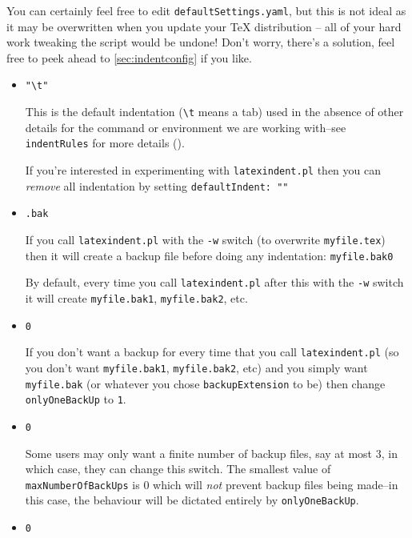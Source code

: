 \documentclass[11pt]{article}
\newcommand{\verbitem}[1]{\small\ttfamily{#1}}
\begin{document}
You can certainly feel free to edit \lstinline!defaultSettings.yaml!, but
this is not ideal as it may be overwritten when you update your \TeX{} distribution --
all of your hard work tweaking the script would be undone! Don't worry,
there's a solution, feel free to peek ahead to \cref{sec:indentconfig} if you like.
\begin{itemize}
	\item[\verbitem{defaultIndent}] \lstinline!"\t"!

		This is the default indentation (\lstinline!\t! means a tab) used in the absence of other details
		for the command or environment we are working with--see \lstinline!indentRules!
		for more details ().

		If you're interested in experimenting with \lstinline!latexindent.pl! then you
		can \emph{remove} all indentation by setting \lstinline!defaultIndent: ""!
	\item[\verbitem{backupExtension}] \lstinline!.bak!

		If you call \lstinline!latexindent.pl! with the \lstinline!-w! switch (to overwrite
		\lstinline!myfile.tex!) then it will create a backup file before doing
		any indentation: \lstinline!myfile.bak0!

		By default, every time you call \lstinline!latexindent.pl! after this with
		the \lstinline!-w! switch it will create \lstinline!myfile.bak1!, \lstinline!myfile.bak2!,
		etc.
	\item[\verbitem{onlyOneBackUp}] \lstinline!0!

		\label{page:onlyonebackup}
		If you don't want a backup for every time that you call \lstinline!latexindent.pl! (so
		you don't want \lstinline!myfile.bak1!, \lstinline!myfile.bak2!, etc) and you simply
		want \lstinline!myfile.bak! (or whatever you chose \lstinline!backupExtension! to be)
		then change \lstinline!onlyOneBackUp! to \lstinline!1!.

	\item[\verbitem{maxNumberOfBackUps}]\lstinline!0!

		Some users may only want a finite number of backup files,
		say at most $3$, in which case, they can change this switch.
		The smallest value of \lstinline!maxNumberOfBackUps! is $0$ which will \emph{not}
		prevent backup files being made--in this case, the behaviour will be dictated
		entirely by \lstinline!onlyOneBackUp!.
	\item[\verbitem{cycleThroughBackUps}]\lstinline!0!


\end{itemize}
\end{document}

